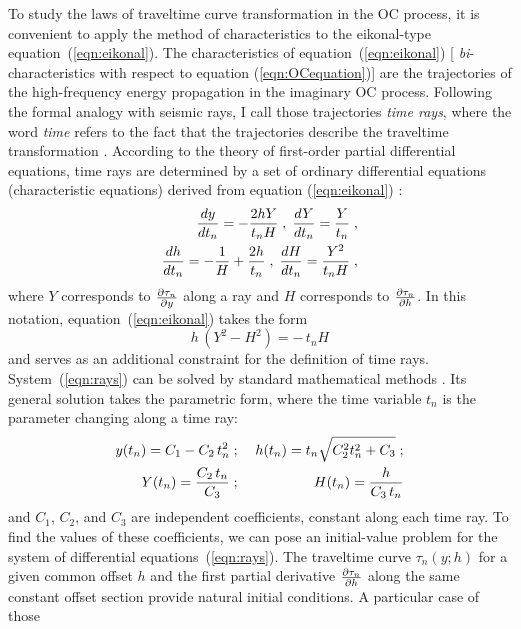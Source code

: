 To study the laws of traveltime curve transformation in the OC
process, it is convenient to apply the method of characteristics
\cite[]{kurant} to the eikonal-type equation~(\ref{eqn:eikonal}). The
characteristics of equation~(\ref{eqn:eikonal}) [{\em
  bi}-characteristics with respect to equation (\ref{eqn:OCequation})]
are the trajectories of the high-frequency energy propagation in the
imaginary OC process. Following the formal analogy with seismic rays,
I call those trajectories {\em time rays}, where the word {\em time}
refers to the fact that the trajectories describe the traveltime
transformation \cite[]{me}.  According to the theory of first-order
partial differential equations, time rays are determined by a set of
ordinary differential equations (characteristic equations) derived
from equation (\ref{eqn:eikonal}) :
\begin{eqnarray}
{{{dy} \over {dt_n}}   =  - {{2 h Y} \over {t_n H}}}\;,\; 
{{{dY} \over {dt_n}}  =  {Y \over t_n}}\;, 
\nonumber \\
{{{dh} \over {dt_n}}  =  {-{1 \over H}+{{2 h} \over t_n}}}\;,\;
{{{dH} \over {dt_n}} = {{Y^2} \over {t_n H}}}\;, 
\label{eqn:rays} 
\end{eqnarray}
where $Y$ corresponds to $\partial \tau_n \over \partial y$ along a
ray and $H$ corresponds to $\partial \tau_n \over \partial h$. In this
notation, equation~(\ref{eqn:eikonal}) takes the form
\begin{equation}
h\, (Y^2-H^2) = -\, t_n H 
\label{eqn:rayeikonal} 
\end{equation}
and serves as an additional constraint for the definition of time
rays.  System~(\ref{eqn:rays}) can be solved by standard mathematical
methods \cite[]{ode}. Its general solution takes the parametric form,
where the time variable $t_n$ is the parameter changing along a time
ray:
\begin{eqnarray}
y(t_n)  =  C_1-C_2\,t_n^2 \; & ; & \;h(t_n)=t_n \sqrt{C_2^2 t_n^2 + C_3}\;;
\\ 
Y(t_n)  =  {{C_2\,t_n}\over C_3}\; & ; & \;H(t_n)={h \over {C_3\,t_n}}
\label{eqn:ray} 
\end{eqnarray}
and $C_1$, $C_2$, and $C_3$ are independent coefficients, constant
along each time ray. To find the values of these coefficients, we can
pose an initial-value problem for the system of differential
equations~(\ref{eqn:rays}).  The traveltime curve $\tau_n(y;h)$ for a
given common offset $h$ and the first partial derivative $\partial
\tau_n \over \partial h$ along the same constant offset section
provide natural initial conditions. A particular case of those
